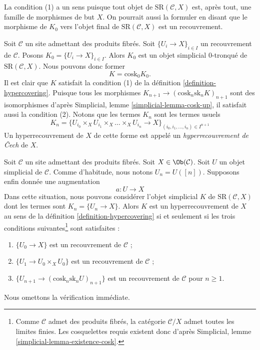 \noindent
La condition (1) a un sens puisque tout objet de
$\text{SR}(\mathcal{C}, X)$ est, après tout, une famille
de morphismes de but $X$. On pourrait aussi
la formuler en disant que le morphisme de $K_0$ vers
l'objet final de $\text{SR}(\mathcal{C}, X)$
est un recouvrement.

\begin{example}
\label{example-cech}
Soit $\mathcal{C}$ un site admettant des produits fibrés.
Soit $\{U_i \to X\}_{i \in I}$ un recouvrement de $\mathcal{C}$.
Posons $K_0 = \{U_i \to X\}_{i \in I}$.
Alors $K_0$ est un objet simplicial $0$-tronqué de
$\text{SR}(\mathcal{C}, X)$. Nous pouvons donc former
$$
K = \text{cosk}_0 K_0.
$$
Il est clair que $K$ satisfait la condition (1) de la définition \ref{definition-hypercovering}.
Puisque tous les morphismes $K_{n + 1} \to (\text{cosk}_n \text{sk}_n K)_{n + 1}$
sont des isomorphismes d'après
Simplicial, lemme \ref{simplicial-lemma-cosk-up},
il satisfait aussi la condition (2). Notons que
les termes $K_n$ sont les termes usuels
$$
K_n = \{
U_{i_0} \times_X U_{i_1} \times_X \ldots \times_X U_{i_n} \to X
\}_{(i_0, i_1, \ldots, i_n) \in I^{n + 1}}
$$
Un hyperrecouvrement de $X$ de cette forme est appelé un
{\it hyperrecouvrement de {\v C}ech} de $X$.
\end{example}

\begin{example}
\label{example-hypercovering-in-C}
Soit $\mathcal{C}$ un site admettant des produits fibrés. Soit
$X \in \Ob(\mathcal{C})$. Soit $U$ un objet simplicial de $\mathcal{C}$.
Comme d'habitude, nous notons $U_n = U([n])$. Supposons enfin donnée une augmentation
$$
a : U \to X
$$
Dans cette situation, nous pouvons considérer l'objet simplicial $K$
de $\text{SR}(\mathcal{C}, X)$ dont les termes sont $K_n = \{U_n \to X\}$.
Alors $K$ est un hyperrecouvrement de $X$ au sens de la
définition \ref{definition-hypercovering}
si et seulement si les trois
conditions suivantes\footnote{Comme $\mathcal{C}$ admet des produits fibrés, la
catégorie $\mathcal{C}/X$ admet toutes les limites finies.
Les cosquelettes requis existent donc d'après
Simplicial, lemme \ref{simplicial-lemma-existence-cosk}.} sont satisfaites :
\begin{enumerate}
\item $\{U_0 \to X\}$ est un recouvrement de $\mathcal{C}$ ;
\item $\{U_1 \to U_0 \times_X U_0\}$ est un recouvrement de $\mathcal{C}$ ;
\item $\{U_{n + 1} \to (\text{cosk}_n\text{sk}_n U)_{n + 1}\}$
est un recouvrement de $\mathcal{C}$ pour $n \geq 1$.
\end{enumerate}
Nous omettons la vérification immédiate.
\end{example}

